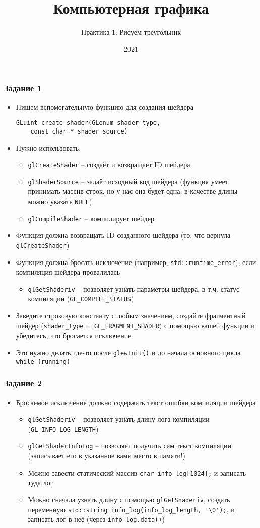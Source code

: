 \documentclass{beamer}
\title{Компьютерная графика}
\subtitle{Практика 1: Рисуем треугольник}
\date{2021}
\begin{document}
\frame{\titlepage}

\begin{frame}[fragile]
\frametitle{Задание 1}
\fontsize{8pt}{8pt}\selectfont
\begin{itemize}
\item Пишем вспомогательную функцию для создания шейдера
\begin{verbatim}
GLuint create_shader(GLenum shader_type,
    const char * shader_source)
\end{verbatim}
\item Нужно использовать:
\begin{itemize}
\item \verb|glCreateShader| -- создаёт и возвращает ID шейдера
\item \verb|glShaderSource| -- задаёт исходный код шейдера (функция умеет принимать массив строк, но у нас она будет одна; в качестве длины можно указать \verb|NULL|)
\item \verb|glCompileShader| -- компилирует шейдер
\end{itemize}
\item Функция должна возвращать ID созданного шейдера (то, что вернула \verb|glCreateShader|)
\item Функция должна бросать исключение (например, \verb|std::runtime_error|), если компиляция шейдера провалилась
\begin{itemize}
\item \verb|glGetShaderiv| -- позволяет узнать параметры шейдера, в т.ч. статус компиляции (\verb|GL_COMPILE_STATUS|)
\end{itemize}
\item Заведите строковую константу с любым значением, создайте фрагментный шейдер (\verb|shader_type = GL_FRAGMENT_SHADER|) с помощью вашей функции и убедитесь, что бросается исключение
\item Это нужно делать где-то после \verb|glewInit()| и до начала основного цикла \verb|while (running)|
\end{itemize}
\end{frame}

\begin{frame}[fragile]
\frametitle{Задание 2}
\begin{itemize}
\item Бросаемое исключение должно содержать текст ошибки компиляции шейдера
\begin{itemize}
\item \verb|glGetShaderiv| -- позволяет узнать длину лога компиляции (\verb|GL_INFO_LOG_LENGTH|)
\item \verb|glGetShaderInfoLog| -- позволяет получить сам текст компиляции (записывает его в указанное вами место в памяти!)
\item Можно завести статический массив \verb|char info_log[1024];| и записать туда лог
\item Можно сначала узнать длину с помощью \verb|glGetShaderiv|, создать переменную \verb|std::string info_log(info_log_length, '\0');|, и записать лог в неё (через \verb|info_log.data()|)
\end{itemize}
\end{itemize}
\end{frame}
\end{document}
